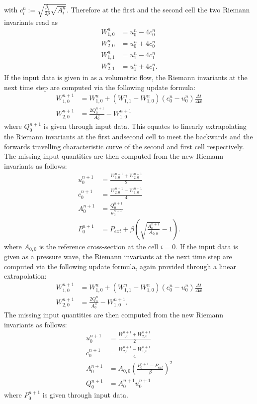 \documentclass[a4paper, oneside]{discothesis}
\begin{document}
	with $c^n_i := \sqrt{\frac{\beta_i}{2\rho}\sqrt{A_i^n}}$.
	Therefore at the first and the second cell the two Riemann invariants read as
	\begin{align}
		W_{1,0}^n &= u^n_0 - 4c^n_0\\
		W_{2,0}^n &= u^n_0 + 4c^n_0\\
		W_{1,1}^n &= u^n_1 - 4c^n_1\\
		W_{2,1}^n &= u^n_1 + 4c^n_1.
	\end{align}
	If the input data is given in as a volumetric flow, the Riemann invariants at the next time step are computed via the following update formula:
	\begin{align}
		W_{1,0}^{n+1} &= W^n_{1,0} + (W^n_{1,1} - W^n_{1,0})(c^n_0-u^n_0) \frac{\Delta t}{\Delta x} \label{update1a}\\
		W_{2,0}^{n+1} &= \frac{2Q^{n+1}_0}{A^n_0} - W^{n+1}_{1,0} \label{update2a}
	\end{align}
	where $Q^{n+1}_0$ is given through input data.
	This equates to linearly extrapolating the Riemann invariants at the first andsecond cell to meet the backwards and the forwards travelling characteristic curve of the second and first cell respectively.
	The missing input quantities are then computed from the new Riemann invariants as follows:
	\begin{align}
		u_0^{n+1} &= \frac{W_{1,0}^{n+1} + W_{2,0}^{n+1}}{2} \\
		c_0^{n+1} &= \frac{W_{2,0}^{n+1} - W_{1,0}^{n+1}}{4} \\
		A_0^{n+1} &= \frac{Q_0^{n+1}}{u_0^{n+1}} \\
		P_0^{n+1} &= P_{ext} + \beta \left( \sqrt{\frac{A_0^{n+1}}{A_{0,0}}} - 1 \right). 
	\end{align}
	where $A_{0,0}$ is the reference cross-section at the cell $i=0$.
	If the input data is given as a pressure wave, the Riemann invariants at the next time step are computed via the following update formula, again provided through a linear extrapolation:
	\begin{align}
		W_{1,0}^{n+1} &= W^n_{1,0} + (W^n_{1,1} - W^n_{1,0})(c^n_0-u^n_0) \frac{\Delta t}{\Delta x} \label{update1b}\\
		W_{2,0}^{n+1} &= \frac{2Q^{n}_0}{A^n_0} - W^{n+1}_{1,0} \label{update2b}.
	\end{align}
	The missing input quantities are then computed from the new Riemann invariants as follows:
	\begin{align}
		u_0^{n+1} &= \frac{W_{1,0}^{n+1} + W_{2,0}^{n+1}}{2} \\
		c_0^{n+1} &= \frac{W_{2,0}^{n+1} - W_{1,0}^{n+1}}{4} \\
		A_0^{n+1} &= A_{0,0}\left(\frac{P_0^{n+1}-P_{ext}}{\beta}\right)^2\\
		Q_0^{n+1} &= A_0^{n+1} u_0^{n+1}
	\end{align}
	where $P^{n+1}_0$ is given through input data.
\end{document}
